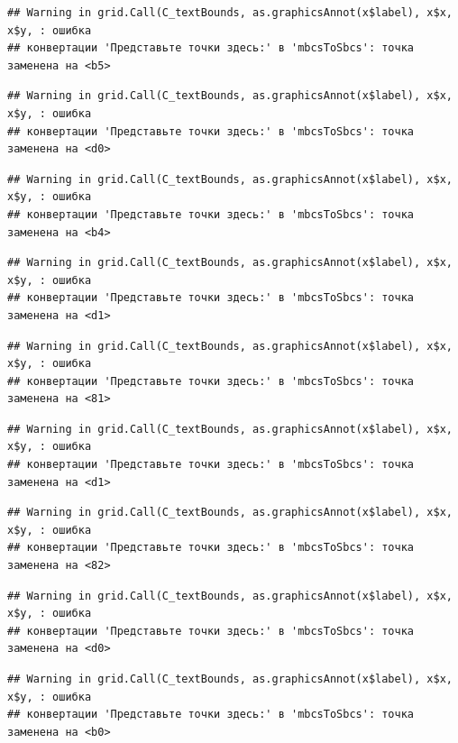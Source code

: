\documentclass[]{book}
\begin{document}
\begin{verbatim}
## Warning in grid.Call(C_textBounds, as.graphicsAnnot(x$label), x$x, x$y, : ошибка
## конвертации 'Представьте точки здесь:' в 'mbcsToSbcs': точка заменена на <b5>
\end{verbatim}

\begin{verbatim}
## Warning in grid.Call(C_textBounds, as.graphicsAnnot(x$label), x$x, x$y, : ошибка
## конвертации 'Представьте точки здесь:' в 'mbcsToSbcs': точка заменена на <d0>
\end{verbatim}

\begin{verbatim}
## Warning in grid.Call(C_textBounds, as.graphicsAnnot(x$label), x$x, x$y, : ошибка
## конвертации 'Представьте точки здесь:' в 'mbcsToSbcs': точка заменена на <b4>
\end{verbatim}

\begin{verbatim}
## Warning in grid.Call(C_textBounds, as.graphicsAnnot(x$label), x$x, x$y, : ошибка
## конвертации 'Представьте точки здесь:' в 'mbcsToSbcs': точка заменена на <d1>
\end{verbatim}

\begin{verbatim}
## Warning in grid.Call(C_textBounds, as.graphicsAnnot(x$label), x$x, x$y, : ошибка
## конвертации 'Представьте точки здесь:' в 'mbcsToSbcs': точка заменена на <81>
\end{verbatim}

\begin{verbatim}
## Warning in grid.Call(C_textBounds, as.graphicsAnnot(x$label), x$x, x$y, : ошибка
## конвертации 'Представьте точки здесь:' в 'mbcsToSbcs': точка заменена на <d1>
\end{verbatim}

\begin{verbatim}
## Warning in grid.Call(C_textBounds, as.graphicsAnnot(x$label), x$x, x$y, : ошибка
## конвертации 'Представьте точки здесь:' в 'mbcsToSbcs': точка заменена на <82>
\end{verbatim}

\begin{verbatim}
## Warning in grid.Call(C_textBounds, as.graphicsAnnot(x$label), x$x, x$y, : ошибка
## конвертации 'Представьте точки здесь:' в 'mbcsToSbcs': точка заменена на <d0>
\end{verbatim}

\begin{verbatim}
## Warning in grid.Call(C_textBounds, as.graphicsAnnot(x$label), x$x, x$y, : ошибка
## конвертации 'Представьте точки здесь:' в 'mbcsToSbcs': точка заменена на <b0>
\end{verbatim}
\end{document}
